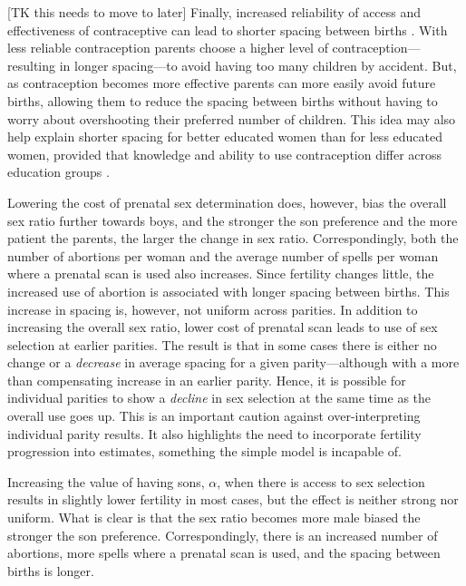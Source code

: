 \documentclass[12pt,letterpaper]{article}
\begin{document}
[TK this needs to move to later]
Finally, increased reliability of access and effectiveness of
contraceptive can lead to shorter spacing between births 
\citep{Keyfitz1971,Heckman1976}.
With less reliable contraception parents choose a higher level of 
contraception---resulting in longer spacing---to avoid having 
too many children by accident.
But, as contraception becomes more effective parents can more
easily avoid future births, allowing them to reduce the spacing 
between births without having to worry about overshooting their 
preferred number of children.
This idea may also help explain shorter spacing for better 
educated women than for less educated women, provided that   
knowledge and ability to use contraception differ
across education groups \citep{Tulasidhar1993,Whitworth2002}.







Lowering the cost of prenatal sex determination does, however, bias the overall sex 
ratio further towards boys, and the stronger the son preference and the 
more patient the parents, the larger the change in sex ratio.
Correspondingly, both the number of abortions per woman and the
average number of spells per woman where a prenatal scan is used also increases.
Since fertility changes little, the increased use of abortion
is associated with longer spacing between births.
This increase in spacing is, however, not uniform across parities.
In addition to increasing the overall sex ratio, lower cost of prenatal 
scan leads to use of sex selection at earlier parities.
The result is that in some cases there is either no change or a \emph{decrease} 
in average spacing for a given parity---although with a more than compensating 
increase in an earlier parity.
Hence, it is possible for individual parities to show a \emph{decline}
in sex selection at the same time as the overall use goes up.
This is an important caution against over-interpreting
individual parity results.
It also highlights the need to incorporate fertility progression into
estimates, something the simple model is incapable of.



Increasing the value of having sons, $\alpha$, when there is access to 
sex selection results in slightly lower fertility in most cases,
but the effect is neither strong nor uniform.
What is clear is that the sex ratio becomes more male biased 
the stronger the son preference.
Correspondingly, there is an increased number of abortions,
more spells where a prenatal scan is used,
and the spacing between births is longer.
\end{document}
